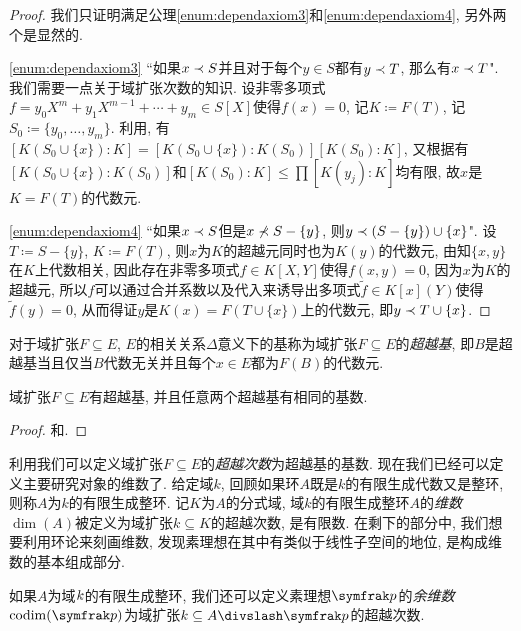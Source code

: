 \begin{proof}
  我们只证明满足公理\ref{enum:dependaxiom3}和\ref{enum:dependaxiom4}, 另外两个是显然的.

  \ref{enum:dependaxiom3} ``如果$x\prec S$并且对于每个$y\in S$都有$y\prec T$, 那么有$x\prec T$". 我们需要一点关于域扩张次数的知识. 设非零多项式$f=y_0X^m+ y_1X^{m-1}+ \dotsb + y_m\in S[X]$使得$f(x)=0$, 记$K\coloneq F(T)$, 记$S_0\coloneq \{y_0, \dotsc, y_m\}$. 利用, 有$[K(S_0\cup\{x\}):K]=[K(S_0\cup\{x\}):K(S_0)][K(S_0):K]$, 又根据有$[K(S_0\cup\{x\}):K(S_0)]$和$[K(S_0):K]\leq\prod [K(y_j):K]$均有限, 故$x$是$K=F(T)$的代数元.

  \ref{enum:dependaxiom4} ``如果$x\prec S$但是$x\nprec S-\{y\}$, 则$y\prec (S-\{y\})\cup\{x\}$". 设$T\coloneq S-\{y\}$, $K\coloneq F(T)$, 则$x$为$K$的超越元同时也为$K(y)$的代数元, 由知$\{x, y\}$在$K$上代数相关, 因此存在非零多项式$f\in K[X, Y]$使得$f(x, y)=0$, 因为$x$为$K$的超越元, 所以$f$可以通过合并系数以及代入来诱导出多项式$\tilde{f}\in K[x](Y)$使得$\tilde{f}(y)=0$, 从而得证$y$是$K(x)=F(T\cup\{x\})$上的代数元, 即$y\prec T\cup \{x\}$.
\end{proof}

\begin{definition}
  对于域扩张$F\subseteq E$, $E$的相关关系$\Delta$意义下的基称为域扩张$F\subseteq E$的\emph{超越基}, 即$B$是超越基当且仅当$B$代数无关并且每个$x\in E$都为$F(B)$的代数元.
\end{definition}

\begin{theorem}\label{thm:tranbasis}
  域扩张$F\subseteq E$有超越基, 并且任意两个超越基有相同的基数.
\end{theorem}

\begin{proof}
  和.
\end{proof}

利用我们可以定义域扩张$F\subseteq E$的\emph{超越次数}为超越基的基数. 现在我们已经可以定义主要研究对象的维数了. 给定域$k$, 回顾如果环$A$既是$k$的有限生成代数又是整环, 则称$A$为$k$的有限生成整环. 记$K$为$A$的分式域, 域$k$的有限生成整环$A$的\emph{维数} $\dim (A)$被定义为域扩张$k\subseteq K$的超越次数, 是有限数. 在剩下的部分中, 我们想要利用环论来刻画维数, 发现素理想在其中有类似于线性子空间的地位, 是构成维数的基本组成部分.

如果$A$为域$k$的有限生成整环, 我们还可以定义素理想$\ideal{p}$的\emph{余维数} $\codim (\ideal{p})$为域扩张$k\subseteq A{\divslash}\ideal{p}$的超越次数.

